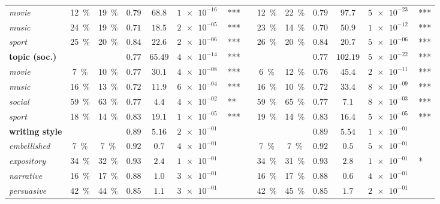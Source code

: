 \begin{tabular}{lccccr@{\hskip0pt}llccccr@{\hskip0pt}l}
\textit{movie} & \SI{12}{\percent} & \SI{19}{\percent} & $0.79$ & $68.8$ & $\SI{1e-16}{}$ & *** && \SI{12}{\percent} & \SI{22}{\percent} & $0.79$ & $97.7$ & $\SI{5e-23}{}$ & *** \\
\textit{music} & \SI{24}{\percent} & \SI{19}{\percent} & $0.71$ & $18.5$ & $\SI{2e-05}{}$ & *** && \SI{23}{\percent} & \SI{14}{\percent} & $0.70$ & $50.9$ & $\SI{1e-12}{}$ & *** \\
\textit{sport} & \SI{25}{\percent} & \SI{20}{\percent} & $0.84$ & $22.6$ & $\SI{2e-06}{}$ & *** && \SI{26}{\percent} & \SI{20}{\percent} & $0.84$ & $20.7$ & $\SI{5e-06}{}$ & *** \\
\midrule\textbf{topic (soc.)} & & & $0.77$ & $65.49$ & $\SI{4e-14}{}$ & *** && & & $0.77$ & $102.19$ & $\SI{5e-22}{}$ & *** \\
\textit{movie} & \SI{7}{\percent} & \SI{10}{\percent} & $0.77$ & $30.1$ & $\SI{4e-08}{}$ & *** && \SI{6}{\percent} & \SI{12}{\percent} & $0.76$ & $45.4$ & $\SI{2e-11}{}$ & *** \\
\textit{music} & \SI{16}{\percent} & \SI{13}{\percent} & $0.72$ & $11.9$ & $\SI{6e-04}{}$ & *** && \SI{16}{\percent} & \SI{10}{\percent} & $0.72$ & $33.4$ & $\SI{8e-09}{}$ & *** \\
\textit{social} & \SI{59}{\percent} & \SI{63}{\percent} & $0.77$ & $4.4$ & $\SI{4e-02}{}$ & ** && \SI{59}{\percent} & \SI{65}{\percent} & $0.77$ & $7.1$ & $\SI{8e-03}{}$ & *** \\
\textit{sport} & \SI{18}{\percent} & \SI{14}{\percent} & $0.83$ & $19.1$ & $\SI{1e-05}{}$ & *** && \SI{19}{\percent} & \SI{14}{\percent} & $0.83$ & $16.4$ & $\SI{5e-05}{}$ & *** \\
\midrule\textbf{writing style} & & & $0.89$ & $5.16$ & $\SI{2e-01}{}$ &  && & & $0.89$ & $5.54$ & $\SI{1e-01}{}$ &  \\
\textit{embellished} & \SI{7}{\percent} & \SI{7}{\percent} & $0.92$ & $0.7$ & $\SI{4e-01}{}$ &  && \SI{7}{\percent} & \SI{7}{\percent} & $0.92$ & $0.5$ & $\SI{5e-01}{}$ &  \\
\textit{expository} & \SI{34}{\percent} & \SI{32}{\percent} & $0.93$ & $2.4$ & $\SI{1e-01}{}$ &  && \SI{34}{\percent} & \SI{31}{\percent} & $0.93$ & $2.8$ & $\SI{1e-01}{}$ & * \\
\textit{narrative} & \SI{16}{\percent} & \SI{17}{\percent} & $0.88$ & $1.0$ & $\SI{3e-01}{}$ &  && \SI{16}{\percent} & \SI{17}{\percent} & $0.88$ & $0.6$ & $\SI{4e-01}{}$ &  \\
\textit{persuasive} & \SI{42}{\percent} & \SI{44}{\percent} & $0.85$ & $1.1$ & $\SI{3e-01}{}$ &  && \SI{42}{\percent} & \SI{45}{\percent} & $0.85$ & $1.7$ & $\SI{2e-01}{}$ &  \\
\bottomrule\end{tabular}